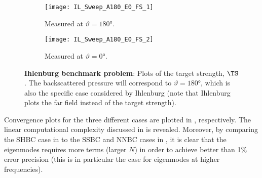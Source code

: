 \begin{figure}
	\centering
	\begin{subfigure}[t]{\textwidth}
		\centering
		\texttt{[image: IL\_Sweep\_A180\_E0\_FS\_1]}
		\caption{Measured at $\vartheta = \ang{180}$.}
		\label{Fig1:Ihlenburg1}
	\end{subfigure}
	\par\bigskip
	\begin{subfigure}[t]{\textwidth}
		\centering
		\texttt{[image: IL\_Sweep\_A180\_E0\_FS\_2]}
		\caption{Measured at $\vartheta = \ang{0}$.}
		\label{Fig1:Ihlenburg2}
	\end{subfigure}
	\caption{\textbf{Ihlenburg benchmark problem}: Plots of the target strength, $\TS$. The backscattered pressure will correspond to $\vartheta=\ang{180}$, which is also the specific case considered by Ihlenburg \cite[p. 192]{Ihlenburg1998fea} (note that Ihlenburg plots the far field instead of the target strength).}
\end{figure}
Convergence plots for the three different cases are plotted in , respectively. The linear computational complexity discussed in  is revealed. Moreover, by comparing the SHBC case in  to the SSBC and NNBC cases in , it is clear that the eigenmodes requires more terms (larger $N$) in order to achieve better than 1\% error precision (this is in particular the case for eigenmodes at higher frequencies). 

